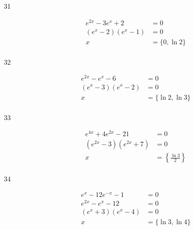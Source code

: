 \documentclass{exam}
\begin{document}
\begin{description}
      \item[31]
        \begin{align*}
          e^{2x} - 3e^x + 2  &= 0 \\
          (e^x - 2)(e^x - 1) &= 0 \\
          x                  &= \boxed{ \{ 0, \ln 2 \} } \\
        \end{align*}

      \item[32]
        \begin{align*}
          e^{2x} - e^x - 6   &= 0 \\
          (e^x - 3)(e^x - 2) &= 0 \\
          x                  &= \boxed{ \{ \ln 2, \ln 3 \} } \\
        \end{align*}

      \item[33]
        \begin{align*}
          e^{4x} + 4e^{2x} - 21    &= 0 \\
          (e^{2x} - 3)(e^{2x} + 7) &= 0 \\
          x                        &= \boxed{ \left\{ \frac{\ln 3}{2} \right\} } \\
        \end{align*}

      \item[34]
        \begin{align*}
          e^x - 12e^{-x} - 1 &= 0 \\
          e^{2x} - e^x - 12  &= 0 \\
          (e^x + 3)(e^x - 4) &= 0 \\
          x                  &= \boxed{ \{ \ln 3, \ln 4 \} } \\
        \end{align*}




\end{description}
\end{document}
